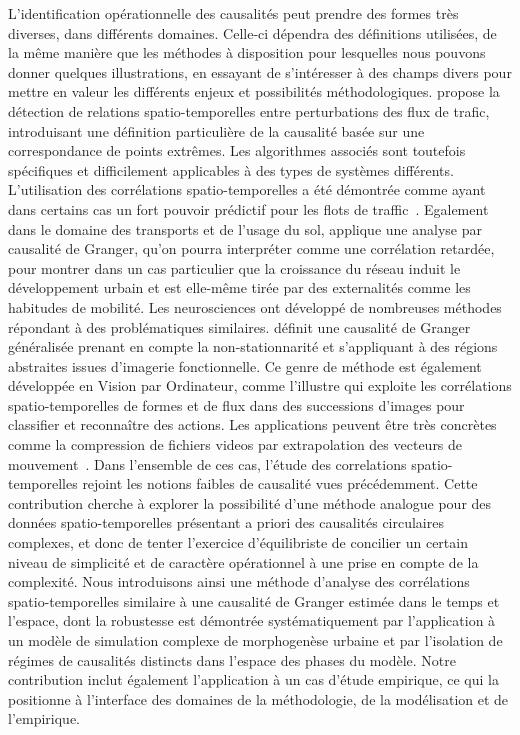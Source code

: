 {}{
L'identification opérationnelle des causalités peut prendre des formes très diverses, dans différents domaines. Celle-ci dépendra des définitions utilisées, de la même manière que les méthodes à disposition pour lesquelles nous pouvons donner quelques illustrations, en essayant de s'intéresser à des champs divers pour mettre en valeur les différents enjeux et possibilités méthodologiques. \cite{liu2011discovering} propose la détection de relations spatio-temporelles entre perturbations des flux de trafic, introduisant une définition particulière de la causalité basée sur une correspondance de points extrêmes. Les algorithmes associés sont toutefois spécifiques et difficilement applicables à des types de systèmes différents. L'utilisation des corrélations spatio-temporelles a été démontrée comme ayant dans certains cas un fort pouvoir prédictif pour les flots de traffic~\cite{min2011real}. Egalement dans le domaine des transports et de l'usage du sol, \cite{xie2009streetcars} applique une analyse par causalité de Granger, qu'on pourra interpréter comme une corrélation retardée, pour montrer dans un cas particulier que la croissance du réseau induit le développement urbain et est elle-même tirée par des externalités comme les habitudes de mobilité. Les neurosciences ont développé de nombreuses méthodes répondant à des problématiques similaires. \cite{luo2013spatio} définit une causalité de Granger généralisée prenant en compte la non-stationnarité et s'appliquant à des régions abstraites issues d'imagerie fonctionnelle. Ce genre de méthode est également développée en Vision par Ordinateur, comme l'illustre \cite{ke2007spatio} qui exploite les corrélations spatio-temporelles de formes et de flux dans des successions d'images pour classifier et reconnaître des actions. Les applications peuvent être très concrètes comme la compression de fichiers videos par extrapolation des vecteurs de mouvement~\cite{chalidabhongse1997fast}. Dans l'ensemble de ces cas, l'étude des correlations spatio-temporelles rejoint les notions faibles de causalité vues précédemment. Cette contribution cherche à explorer la possibilité d'une méthode analogue pour des données spatio-temporelles présentant a priori des causalités circulaires complexes, et donc de tenter l'exercice d'équilibriste de concilier un certain niveau de simplicité et de caractère opérationnel à une prise en compte de la complexité. Nous introduisons ainsi une méthode d'analyse des corrélations spatio-temporelles similaire à une causalité de Granger estimée dans le temps et l'espace, dont la robustesse est démontrée systématiquement par l'application à un modèle de simulation complexe de morphogenèse urbaine et par l'isolation de régimes de causalités distincts dans l'espace des phases du modèle. Notre contribution inclut également l'application à un cas d'étude empirique, ce qui la positionne à l'interface des domaines de la méthodologie, de la modélisation et de l'empirique.
}


